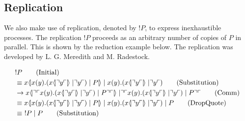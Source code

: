 \subsection{Replication}
We also make use of replication, denoted by $!P$, to express inexhaustible processes.
The replication $!P$ proceeds as an arbitrary number of copies of $P$ in parallel. This is shown by the reduction example below. The replication was developed by L. G. Meredith and M. Radestock\citep{Meredith2005}.

\begin{align}
        &!P \tag{Initial} \\
        &\equiv \lift{x}{\inp{x}{y}(\lift{x}{\drop{y}}\para\drop{y})\para P}\para\inp{x}{y}(\lift{x}{\drop{y}}\para \drop{y}) \tag{Substitution} \\
        &\ra \lift{x}{\drop{\quot{\inp{x}{y}(\lift{x}{\drop{y}}\para\drop{y})\para P}}}\para\drop{\quot{\inp{x}{y}(\lift{x}{\drop{y}}\para\drop{y})\para P}} \tag{Comm}\\
        &\equiv \lift{x}{\inp{x}{y}(\lift{x}{\drop{y}}\para\drop{y})\para P}\para\inp{x}{y}(\lift{x}{\drop{y}}\para \drop{y})\para P \tag{DropQuote} \\
        &\equiv\ 
        !P\para P \tag{Substitution}
\end{align}

\FloatBarrier